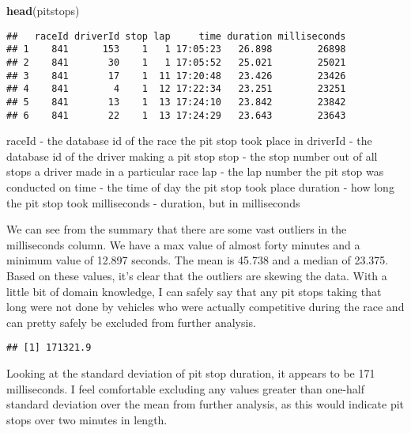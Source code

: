 \documentclass[]{article}
\newenvironment{Shaded}{\begin{snugshade}}{\end{snugshade}}
\newcommand{\KeywordTok}[1]{\textcolor[rgb]{0.13,0.29,0.53}{\textbf{#1}}}
\newcommand{\StringTok}[1]{\textcolor[rgb]{0.31,0.60,0.02}{#1}}
\newcommand{\OperatorTok}[1]{\textcolor[rgb]{0.81,0.36,0.00}{\textbf{#1}}}
\newcommand{\NormalTok}[1]{#1}
\begin{document}
\begin{Shaded}
\begin{Highlighting}[]
\KeywordTok{head}\NormalTok{(pitstops)}
\end{Highlighting}
\end{Shaded}

\begin{verbatim}
##   raceId driverId stop lap     time duration milliseconds
## 1    841      153    1   1 17:05:23   26.898        26898
## 2    841       30    1   1 17:05:52   25.021        25021
## 3    841       17    1  11 17:20:48   23.426        23426
## 4    841        4    1  12 17:22:34   23.251        23251
## 5    841       13    1  13 17:24:10   23.842        23842
## 6    841       22    1  13 17:24:29   23.643        23643
\end{verbatim}

raceId - the database id of the race the pit stop took place in driverId
- the database id of the driver making a pit stop stop - the stop number
out of all stops a driver made in a particular race lap - the lap number
the pit stop was conducted on time - the time of day the pit stop took
place duration - how long the pit stop took milliseconds - duration, but
in milliseconds

We can see from the summary that there are some vast outliers in the
milliseconds column. We have a max value of almost forty minutes and a
minimum value of 12.897 seconds. The mean is 45.738 and a median of
23.375. Based on these values, it's clear that the outliers are skewing
the data. With a little bit of domain knowledge, I can safely say that
any pit stops taking that long were not done by vehicles who were
actually competitive during the race and can pretty safely be excluded
from further analysis.

\begin{Shaded}
\end{Shaded}

\begin{verbatim}
## [1] 171321.9
\end{verbatim}

Looking at the standard deviation of pit stop duration, it appears to be
171 milliseconds. I feel comfortable excluding any values greater than
one-half standard deviation over the mean from further analysis, as this
would indicate pit stops over two minutes in length.
\end{document}
